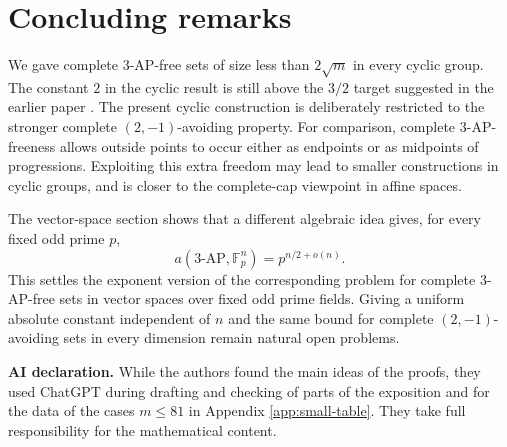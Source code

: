 \documentclass[11pt]{article}
\newcommand{\F}{\mathbb F}
\newcommand{\AP}{\mathrm{AP}}
\begin{document}
	\section{Concluding remarks}
	
	We gave complete $3$-AP-free sets of size less than $2\sqrt m$ in
	every cyclic group.
	The constant $2$ in the cyclic result is still above the $3/2$ target suggested
	in the earlier paper \cite{CsajbokNagy2025}.  The present cyclic construction is deliberately
	restricted to the stronger complete $(2,-1)$-avoiding property.  For comparison, 
	complete $3$-AP-freeness allows outside points to occur either as endpoints or
	as midpoints of progressions.  Exploiting this extra freedom may lead to
	smaller constructions in cyclic groups, and is closer to the complete-cap
	viewpoint in affine spaces.
	
	The vector-space section shows that a different algebraic idea gives, for every
	fixed odd prime $p$,
	\[
	a(3\text{-}\AP,\F_p^n)
	=p^{n/2+o(n)} .
	\]
	This settles the exponent version of the corresponding problem
	for  complete $3$-AP-free sets in vector spaces over fixed odd prime
	fields.  Giving a uniform absolute constant independent of $n$ and the same bound for complete $(2,-1)$-avoiding sets in every
	dimension  remain natural open problems.
	\bigskip
	
	\noindent \textbf{AI declaration.} While the authors found  the main ideas of the proofs, they used ChatGPT during drafting and checking of parts of the exposition and for the data of the cases $m\leq 81$ in Appendix \ref{app:small-table}. They take full responsibility for the mathematical content.
	
\end{document}
